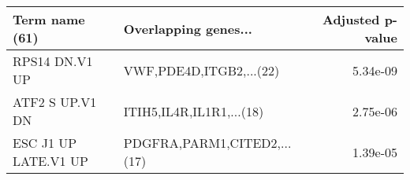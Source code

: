 \begin{tabular}{llr}
\toprule
      Term name (61) &        Overlapping genes... &  Adjusted p-value \\
\midrule
      RPS14 DN.V1 UP &     VWF,PDE4D,ITGB2,...(22) &          5.34e-09 \\
     ATF2 S UP.V1 DN &    ITIH5,IL4R,IL1R1,...(18) &          2.75e-06 \\
ESC J1 UP LATE.V1 UP & PDGFRA,PARM1,CITED2,...(17) &          1.39e-05 \\
\bottomrule
\end{tabular}
